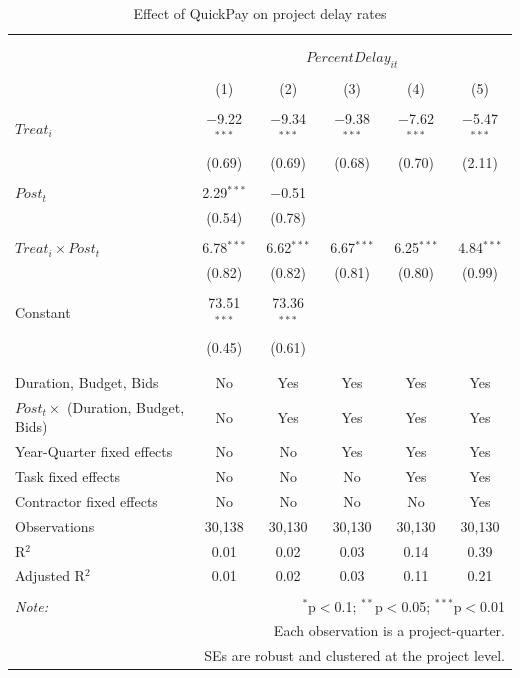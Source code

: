 \documentclass[
]{article}
\begin{document}
\begin{table}[H] \centering 
  \caption{Effect of QuickPay on project delay rates} 
  \label{} 
\small 
\begin{tabular}{@{\extracolsep{-2pt}}lccccc} 
\\[-1.8ex]\hline 
\hline \\[-1.8ex] 
\\[-1.8ex] & \multicolumn{5}{c}{$PercentDelay_{it}$} \\ 
\\[-1.8ex] & (1) & (2) & (3) & (4) & (5)\\ 
\hline \\[-1.8ex] 
 $Treat_i$ & $-$9.22$^{***}$ & $-$9.34$^{***}$ & $-$9.38$^{***}$ & $-$7.62$^{***}$ & $-$5.47$^{***}$ \\ 
  & (0.69) & (0.69) & (0.68) & (0.70) & (2.11) \\ 
  & & & & & \\ 
 $Post_t$ & 2.29$^{***}$ & $-$0.51 &  &  &  \\ 
  & (0.54) & (0.78) &  &  &  \\ 
  & & & & & \\ 
 $Treat_i \times Post_t$ & 6.78$^{***}$ & 6.62$^{***}$ & 6.67$^{***}$ & 6.25$^{***}$ & 4.84$^{***}$ \\ 
  & (0.82) & (0.82) & (0.81) & (0.80) & (0.99) \\ 
  & & & & & \\ 
 Constant & 73.51$^{***}$ & 73.36$^{***}$ &  &  &  \\ 
  & (0.45) & (0.61) &  &  &  \\ 
  & & & & & \\ 
\hline \\[-1.8ex] 
Duration, Budget, Bids & No & Yes & Yes & Yes & Yes \\ 
$Post_t \times$  (Duration, Budget, Bids) & No & Yes & Yes & Yes & Yes \\ 
Year-Quarter fixed effects & No & No & Yes & Yes & Yes \\ 
Task fixed effects & No & No & No & Yes & Yes \\ 
Contractor fixed effects & No & No & No & No & Yes \\ 
Observations & 30,138 & 30,130 & 30,130 & 30,130 & 30,130 \\ 
R$^{2}$ & 0.01 & 0.02 & 0.03 & 0.14 & 0.39 \\ 
Adjusted R$^{2}$ & 0.01 & 0.02 & 0.03 & 0.11 & 0.21 \\ 
\hline 
\hline \\[-1.8ex] 
\textit{Note:}  & \multicolumn{5}{r}{$^{*}$p$<$0.1; $^{**}$p$<$0.05; $^{***}$p$<$0.01} \\ 
 & \multicolumn{5}{r}{Each observation is a project-quarter.} \\ 
 & \multicolumn{5}{r}{SEs are robust and clustered at the project level.} \\ 
\end{tabular} 
\end{table}
\end{document}
